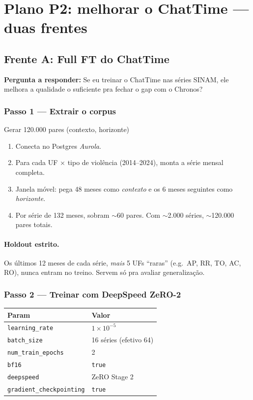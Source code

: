 \documentclass[11pt,a4paper]{article}
\newcommand{\code}[1]{\texttt{\small #1}}
\begin{document}
\section{Plano P2: melhorar o ChatTime --- duas frentes}
\label{sec:chattime}

\subsection{Frente A: Full FT do ChatTime}

\textbf{Pergunta a responder:} Se eu treinar o ChatTime nas séries
SINAM, ele melhora a qualidade o suficiente pra fechar o gap com o
Chronos?

\subsubsection{Passo 1 --- Extrair o corpus}

\begin{passo}{Gerar 120.000 pares (contexto, horizonte)}
\begin{enumerate}[leftmargin=*]
\item Conecta no Postgres \emph{Aurola}.
\item Para cada UF $\times$ tipo de violência (2014--2024), monta a
série mensal completa.
\item Janela móvel: pega 48 meses como \emph{contexto} e os 6 meses
seguintes como \emph{horizonte}.
\item Por série de 132 meses, sobram $\sim$60 pares. Com $\sim$2.000
séries, $\sim$120.000 pares totais.
\end{enumerate}
\end{passo}

\paragraph{Holdout estrito.} Os últimos 12 meses de cada série,
\emph{mais} 5 UFs ``raras'' (e.g.\ AP, RR, TO, AC, RO), nunca entram
no treino. Servem só pra avaliar generalização.

\subsubsection{Passo 2 --- Treinar com DeepSpeed ZeRO-2}

\begin{table}[h!]
\centering
\small
\begin{tabular}{@{}l l@{}}
\toprule
\textbf{Param} & \textbf{Valor} \\
\midrule
\code{learning\_rate}    & $1 \times 10^{-5}$ \\
\code{batch\_size}       & 16 séries (efetivo 64) \\
\code{num\_train\_epochs}& 2 \\
\code{bf16}              & \code{true} \\
\code{deepspeed}         & ZeRO Stage 2 \\
\code{gradient\_checkpointing} & \code{true} \\
\bottomrule
\end{tabular}
\end{table}
\end{document}
